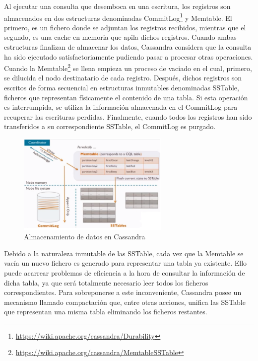 Al ejecutar una consulta que desemboca en una escritura, los registros son almacenados en dos estructuras denominadas CommitLog\footnote{\url{https://wiki.apache.org/cassandra/Durability}} y Memtable. El primero, es un fichero donde se adjuntan los registros recibidos, mientras que el segundo, es una cache en memoria que apila dichos registros. Cuando ambas estructuras finalizan de almacenar los datos, Cassandra considera que la consulta ha sido ejecutado satisfactoriamente pudiendo pasar a procesar otras operaciones.\\

Cuando la Memtable\footnote{\url{https://wiki.apache.org/cassandra/MemtableSSTable}} se llena empieza un proceso de vaciado en el cual, primero, se dilucida el nodo destinatario de cada registro. Después, dichos registros son escritos de forma secuencial en estructuras inmutables denominadas SSTable, ficheros que representan físicamente el contenido de una tabla. Si esta operación es interrumpida, se utiliza la información almacenada en el CommitLog para recuperar las escrituras perdidas. Finalmente, cuando todos los registros han sido transferidos a su correspondiente SSTable, el CommitLog es purgado.\\

\begin{figure}[h]
	\centering
	\includegraphics[width=0.65\textwidth]{Ilustraciones/cassandra_data_storage.png}
	\caption{Almacenamiento de datos en Cassandra}
	\label{fig:almacenamiento_cassandra}
\end{figure}

Debido a la naturaleza inmutable de las SSTable, cada vez que la Memtable se vacía un nuevo fichero es generado para representar una tabla ya existente. Ello puede acarrear problemas de eficiencia a la hora de consultar la información de dicha tabla, ya que será totalmente necesario leer todos los ficheros correspondientes. Para sobreponerse a este inconveniente, Cassandra posee un mecanismo llamado compactación que, entre otras acciones, unifica las SSTable que representan una misma tabla eliminando los ficheros restantes.\\

